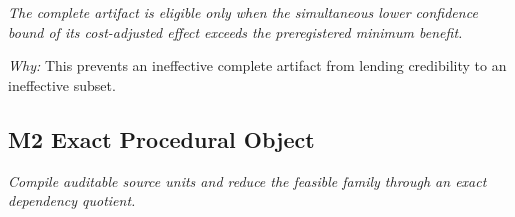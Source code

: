 \documentclass[10pt,a4paper]{article}
\begin{document}
\begin{enumerate}[leftmargin=*,start=1]
\noindent\emph{The complete artifact is eligible only when the simultaneous lower confidence bound of its cost-adjusted effect exceeds the preregistered minimum benefit.}
\par{}
\par\emph{Why:} This prevents an ineffective complete artifact from lending credibility to an ineffective subset.
\end{enumerate}
\subsection*{M2 Exact Procedural Object}
\emph{Compile auditable source units and reduce the feasible family through an exact dependency quotient.}
\end{document}
